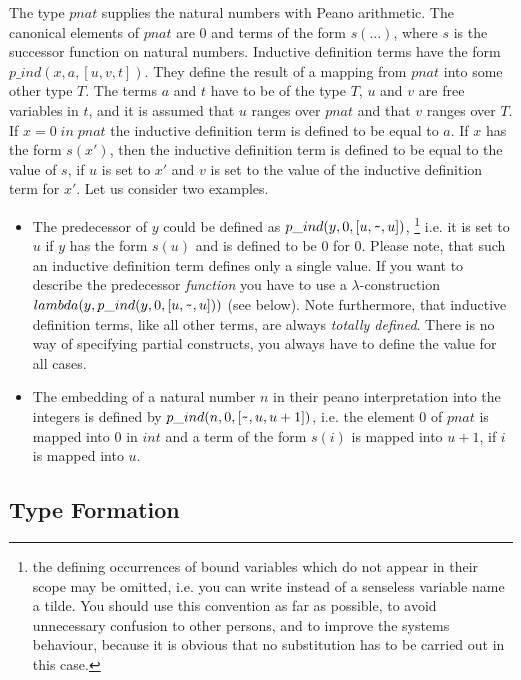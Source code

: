 \documentclass[11pt]{report}
\begin{document}
 The type $pnat$ supplies the natural numbers with Peano arithmetic.
 The canonical elements of $pnat$ are $0$ and terms of the form
 $s(...)$, where $s$ is the successor function on natural numbers.
 Inductive definition terms have the form $p\_ind(x,a,[u,v,t])$.
 They define the result of a mapping from $pnat$ into some other
 type $T$. The terms $a$ and $t$ have to be of the type $T$, $u$ and
 $v$ are free variables in $t$, and it is assumed that $u$ ranges
 over $pnat$ and that $v$ ranges over $T$. If $x=0\; in\; pnat$ the
 inductive definition term is defined to be equal to $a$. If $x$
 has the form $s(x')$, then the inductive definition term is
 defined to be equal to the value of $s$, if $u$ is set to $x'$ and 
 $v$ is set to the value of the inductive definition term for $x'$.
 Let us consider two examples. 
 \begin{itemize}
 \item
 The predecessor of $y$ could be defined as 
 $p\_ind(y,0,[u,\verb'~',u])$,
 \footnote{the defining occurrences of bound variables which do not 
 appear in their scope may be omitted, i.e. you can write instead of
 a senseless variable name a tilde. You should use 
 this convention as far as possible, to avoid unnecessary confusion 
 to other persons,
 and to improve the systems behaviour, because it is obvious that
 no substitution has to be carried out in this case.}
 i.e. it is set to $u$ if $y$
 has the form $s(u)$ and is defined to be $0$ for $0$. 
 Please note, that such an inductive definition term defines only
 a single value. If you want to describe the predecessor \emph{function}
 you have to use a $\lambda$-construction 
 $lambda(y,p\_ind(y,0,[u,\verb'~',u]))$ (see below). Note furthermore,
 that inductive definition terms, like all other terms, are always 
 \emph{totally defined}. There
 is no way of specifying partial constructs, you always have to 
 define the value for all cases.
 \item
 The embedding of a natural number $n$ in their peano interpretation
 into the integers is defined by $p\_ind(n,0,[\verb'~',u,u+1])$, i.e.
 the element $0$ of $pnat$ is mapped into $0$ in $int$ and a
 term of the form $s(i)$ is mapped into $u+1$, if $i$ is mapped into
 $u$. 
 \end{itemize}
  
  
 \subsection{Type Formation}
  
\end{document}
